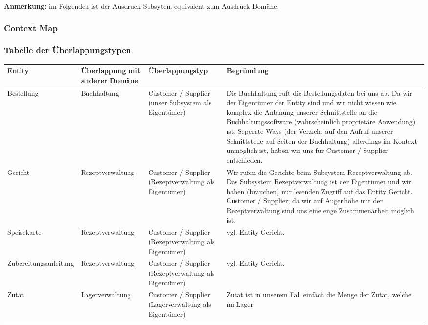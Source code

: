 \textbf{Anmerkung:} im Folgenden ist der Ausdruck Subsytem
equivalent zum Ausdruck Dom\"ane.

\subsubsection{Context Map}


\newpage

\subsubsection{Tabelle der \"Uberlappungstypen}

\begin{longtabu} to 
\hline{}
Entity &\"Uberlappung mit anderer Dom\"ane
  &\"Uberlappungstyp &Begr\"undung \\
\hline
Bestellung &Buchhaltung &Customer / Supplier (unser
  Subsystem als Eigent\"umer) &Die Buchhaltung ruft die
  Bestellungsdaten bei uns ab. Da wir der Eigent\"umer der
  Entity sind und wir nicht wissen wie komplex die Anbinung
  unserer Schnittstelle an die Buchhaltungssoftware
  (wahrscheinlich propriet\"are Anwendung) ist, Seperate
  Ways (der Verzicht auf den Aufruf unserer Schnittstelle
  auf Seiten der Buchhaltung) allerdings im Kontext
  unm\"oglich ist, haben wir uns f\"ur Customer / Supplier
  entschieden. \\
\hline
Gericht &Rezeptver\-waltung &Customer / Supplier
  (Rezeptverwaltung als Eigent\"umer) &Wir rufen
  die Gerichte beim Subsystem Rezeptverwaltung ab. Das
  Subsystem Rezeptverwaltung ist der Eigent\"umer und wir
  haben (brauchen) nur lesenden Zugriff auf das Entity
  Gericht. Customer / Supplier, da wir auf Augenh\"ohe mit
  der Rezeptverwaltung sind uns eine enge Zusammenarbeit
  m\"oglich ist. \\
\hline
Speisekar\-te &Rezeptver\-waltung &Customer / Supplier
  (Rezeptverwaltung als Eigent\"umer) &vgl. Entity Gericht.
  \\
\hline
Zuberei\-tungsanlei\-tung &Rezeptver\-waltung &
  Customer / Supplier (Rezeptverwaltung als Eigent\"umer)
  &vgl. Entity Gericht. \\
\hline
Zutat &Lagerver\-waltung &Customer / Supplier
  (Lagerverwaltung als Eigent\"umer) &Zutat ist in unserem
  Fall einfach die Menge der Zutat, welche im Lager

\end{longtabu}
